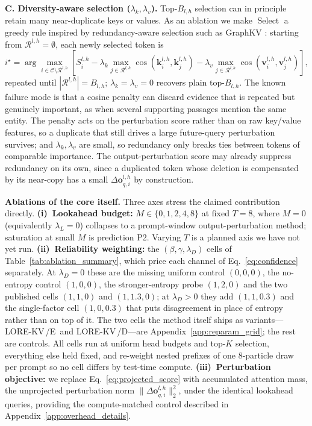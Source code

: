 \documentclass{article} %
\newcommand{\lorekvE}{LORE-KV\,/E}
\newcommand{\lorekvD}{LORE-KV\,/D}
\begin{document}
\textbf{C. Diversity-aware selection ($\lambda_k,\lambda_v$).}
\label{subsec:diversity}
Top-$B_{l,h}$ selection can in principle retain many near-duplicate keys or values. As an ablation we make $\operatorname{Select}$ a greedy rule inspired by redundancy-aware selection such as GraphKV \citep{li2025graphkv}: starting from $\mathcal{R}^{l,h}=\emptyset$, each newly selected token is
\begin{equation}
i^\star=\arg\max_{i\in\mathcal{C}\setminus\mathcal{R}^{l,h}}
\left[
S^{l,h}_{i}
-\lambda_k\max_{j\in\mathcal{R}^{l,h}}\cos(\mathbf{k}^{l,h}_{i},\mathbf{k}^{l,h}_{j})
-\lambda_v\max_{j\in\mathcal{R}^{l,h}}\cos(\mathbf{v}^{l,h}_{i},\mathbf{v}^{l,h}_{j})
\right],
\label{eq:diversity_select}
\end{equation}
repeated until $|\mathcal{R}^{l,h}|=B_{l,h}$; $\lambda_k=\lambda_v=0$ recovers plain top-$B_{l,h}$. The known failure mode is that a cosine penalty can discard evidence that is repeated but genuinely important, as when several supporting passages mention the same entity. The penalty acts on the perturbation score rather than on raw key/value features, so a duplicate that still drives a large future-query perturbation survives; and $\lambda_k,\lambda_v$ are small, so redundancy only breaks ties between tokens of comparable importance. The output-perturbation score may already suppress redundancy on its own, since a duplicated token whose deletion is compensated by its near-copy has a small $\Delta\mathbf{o}^{l,h}_{q,i}$ by construction.

\textbf{Ablations of the core itself.}
\label{subsec:core_ablations}
Three axes stress the claimed contribution directly. \textbf{(i)~Lookahead budget:} $M\in\{0,1,2,4,8\}$ at fixed $T{=}8$, where $M{=}0$ (equivalently $\lambda_L{=}0$) collapses to a prompt-window output-perturbation method; saturation at small $M$ is prediction P2. Varying $T$ is a planned axis we have not yet run. \textbf{(ii)~Reliability weighting:} the $(\beta,\gamma,\lambda_D)$ cells of Table~\ref{tab:ablation_summary}, which price each channel of Eq.~\eqref{eq:confidence} separately. At $\lambda_D{=}0$ these are the missing uniform control $(0,0,0)$, the no-entropy control $(1,0,0)$, the stronger-entropy probe $(1,2,0)$ and the two published cells $(1,1,0)$ and $(1,1.3,0)$; at $\lambda_D{>}0$ they add $(1,1,0.3)$ and the single-factor cell $(1,0,0.3)$ that puts disagreement in place of entropy rather than on top of it. The two cells the method itself ships as variants---\lorekvE\ and \lorekvD---are Appendix~\ref{app:reparam_grid}; the rest are controls. All cells run at uniform head budgets and top-$K$ selection, everything else held fixed, and re-weight nested prefixes of one $8$-particle draw per prompt so no cell differs by test-time compute. \textbf{(iii)~Perturbation objective:} we replace Eq.~\eqref{eq:projected_score} with accumulated attention mass, the unprojected perturbation norm $\|\Delta\mathbf{o}^{l,h}_{q,i}\|_2^2$, under the identical lookahead queries, providing the compute-matched control described in Appendix~\ref{app:overhead_details}.
\end{document}
